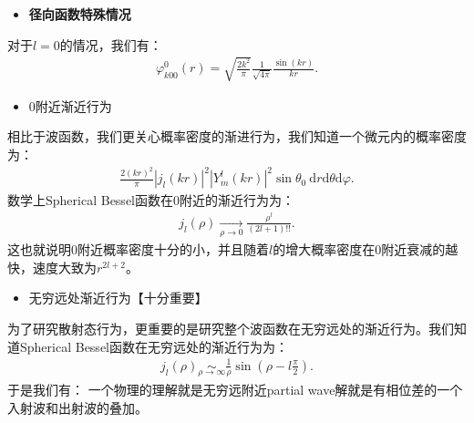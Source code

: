 \begin{itemize}
  \item \textbf{径向函数特殊情况}
\end{itemize}

对于$ l = 0 $的情况，我们有：
\begin{align}
  \varphi_{k00}^0(r)=\sqrt{\frac{2k^2}{\pi}}\frac{1}{\sqrt{4\pi}}\frac{\sin(kr)}{kr}.
\end{align}

\bigskip
{}

\begin{itemize}
  \item 0附近渐近行为
\end{itemize}
相比于波函数，我们更关心概率密度的渐进行为，我们知道一个微元内的概率密度为：
\begin{align}
  \frac{2(kr)^2}{\pi}|j_l(kr)|^2|Y_m^l(kr)|^2\sin\theta_0\mathrm{~d}r\mathrm{d}\theta\mathrm{d}\varphi.
\end{align}
数学上Spherical Bessel函数在0附近的渐近行为为：
\begin{align}
  j_l(\rho)\underset{\rho\to0}{\operatorname*{\operatorname*{\to}}}\frac{\rho^l}{(2l+1)!!}.
\end{align}
这也就说明0附近概率密度十分的小，并且随着$l$的增大概率密度在0附近衰减的越快，速度大致为$ r^{2l+2} $。

\begin{itemize}
  \item 无穷远处渐近行为【十分重要】
\end{itemize}
为了研究散射态行为，更重要的是研究整个波函数在无穷远处的渐近行为。我们知道Spherical Bessel函数在无穷远处的渐近行为为：
\begin{align}
  j_l(\rho)\underset{\rho\to\infty}{\operatorname*{\operatorname*{\sim}}}\frac{1}{\rho}\sin(\rho-l\frac{\pi}{2}).
\end{align}
于是我们有：
一个物理的理解就是无穷远附近partial wave解就是有相位差的一个入射波和出射波的叠加。

\bigskip
{}

